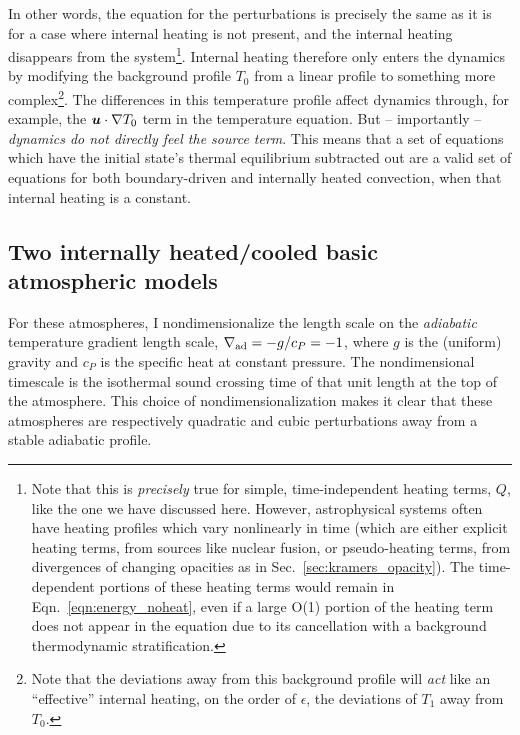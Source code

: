 In other words, the equation for the perturbations is precisely the same as it is for a case where internal heating is not present, and the internal heating disappears from the system\footnote{
Note that this is \emph{precisely} true for simple, time-independent heating terms, $Q$, like the one we have discussed here.
However, astrophysical systems often have heating profiles which vary nonlinearly in time (which are either explicit heating terms, from sources like nuclear fusion, or pseudo-heating terms, from divergences of changing opacities as in Sec.~\ref{sec:kramers_opacity}).
The time-dependent portions of these heating terms would remain in Eqn.~\ref{eqn:energy_noheat}, even if a large O(1) portion of the heating term does not appear in the equation due to its cancellation with a background thermodynamic stratification.
}.
Internal heating therefore only enters the dynamics by modifying the background profile $T_0$ from a linear profile to something more complex\footnote{
Note that the deviations away from this background profile will \emph{act} like an ``effective'' internal heating, on the order of $\epsilon$, the deviations of $T_1$ away from $T_0$.
}.
The differences in this temperature profile affect dynamics through, for example, the $\bm{u}\cdot\nabla T_0$ term in the temperature equation.
But -- importantly -- \emph{dynamics do not directly feel the source term}.
This means that a set of equations which have the initial state's thermal equilibrium subtracted out are a valid set of equations for both boundary-driven and internally heated convection, when that internal heating is a constant.

\subsection{Two internally heated/cooled basic atmospheric models}
\label{sec:atmospheres}
For these atmospheres, I nondimensionalize the length scale on the \emph{adiabatic} temperature gradient length scale, $\nabla_{\text{ad}} = -g/c_P = -1$, where $g$ is the (uniform) gravity and $c_P$ is the specific heat at constant pressure.
The nondimensional timescale is the isothermal sound crossing time of that unit length at the top of the atmosphere.
This choice of nondimensionalization makes it clear that these atmospheres are respectively quadratic and cubic perturbations away from a stable adiabatic profile.

